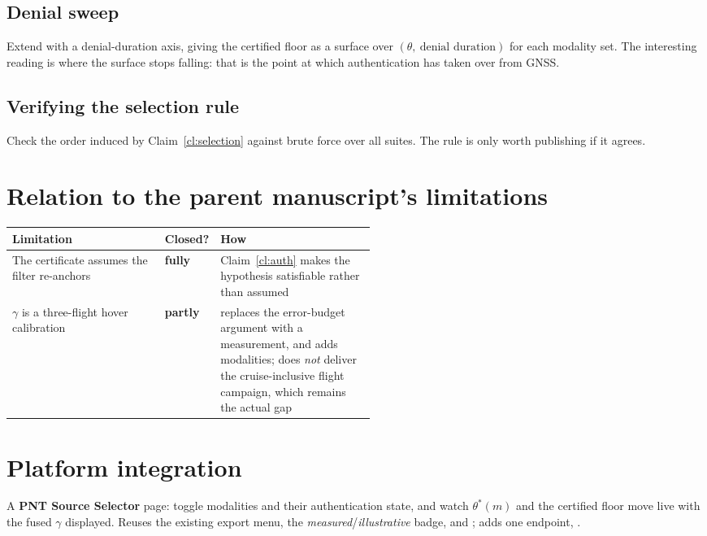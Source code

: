 \documentclass[11pt,a4paper]{article}
\begin{document}
\subsection{Denial sweep}
Extend  with a denial-duration axis, giving the
certified floor as a surface over $(\theta,\ \text{denial duration})$ for each
modality set. The interesting reading is where the surface stops falling: that
is the point at which authentication has taken over from GNSS.

\subsection{Verifying the selection rule}
Check the order induced by Claim~\ref{cl:selection} against brute force over all
suites. The rule is only worth publishing if it agrees.

\section{Relation to the parent manuscript's limitations}
\begin{center}
\small
\begin{tabularx}{\linewidth}{@{}p{0.42\linewidth}p{0.10\linewidth}X@{}}
\toprule
\textbf{Limitation} & \textbf{Closed?} & \textbf{How} \\
\midrule
The certificate assumes the filter re-anchors & \textbf{fully} &
Claim~\ref{cl:auth} makes the hypothesis satisfiable rather than assumed \\
$\gamma$ is a three-flight hover calibration & \textbf{partly} &
replaces the error-budget argument with a measurement, and adds modalities; does
\emph{not} deliver the cruise-inclusive flight campaign, which remains the
actual gap \\
\bottomrule
\end{tabularx}
\end{center}

\section{Platform integration}
A \textbf{PNT Source Selector} page: toggle modalities and their authentication
state, and watch $\theta^{*}(m)$ and the certified floor move live with the
fused $\gamma$ displayed. Reuses the existing export menu, the
\emph{measured}/\emph{illustrative} badge, and ;
adds one endpoint, .
\end{document}
